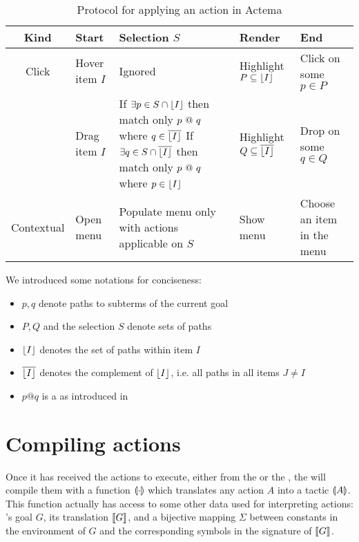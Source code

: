 \begin{table*}[]
  \def\arraystretch{1.5}
  \begin{tabular}{|c|C{0.2\textwidth}|C{0.4\textwidth}|C{0.25\textwidth}|C{0.2\textwidth}|}
  \hline
  \textbf{Kind} & \textbf{Start}       & \textbf{Selection $S$} &
  \textbf{Render}                      & \textbf{End} \\ \hline
  Click         & Hover item $I$       & Ignored & Highlight $P \subseteq
  \lfloor I \rfloor$ & Click on some $p \in P$    \\ \hline
             & Drag item $I$        &
      If $\exists p \in S \cap \lfloor I \rfloor$ then match only $p \operatorname{\,@\,} q$ where
      $q \in \overline{\lfloor I \rfloor}$
      \newline
      If $\exists q \in S \cap \overline{\lfloor I \rfloor}$ then match only $p
      \operatorname{\,@\,} q$ where $p \in \lfloor I \rfloor$
    & Highlight $Q \subseteq \overline{\lfloor I \rfloor}$ & Drop on some $q \in Q$ \\ \hline
  Contextual    & Open menu & Populate menu only with actions
  applicable on $S$ & Show menu & Choose an item in the menu \\ \hline
  \end{tabular}
  \raggedright
  \parbox{\textwidth}{
    \vspace{1.5em}
    We introduced some notations for conciseness:
    \begin{itemize}
      \item $p, q$ denote paths to subterms of the current goal
      \item $P, Q$ and the selection $S$ denote sets of paths
      \item $\lfloor I \rfloor$ denotes the set of paths within item $I$
      \item $\overline{\lfloor I \rfloor}$ denotes the complement of $\lfloor I \rfloor$, i.e.
      all paths in all items $J \not= I$
      \item $p @ q$ is a  as introduced in 
    \end{itemize}}

  \caption{Protocol for applying an action in Actema}
\end{table*}


\section{Compiling actions}

Once it has received the actions to execute, either from the 
or the , the  will compile them with a function
$\llparenthesis \cdot \rrparenthesis$ which translates any action $A$ into a  tactic
$\llparenthesis A \rrparenthesis$. This function actually has access to some other data used for
interpreting actions: 's goal $G$, its  translation $\llbracket G \rrbracket$, and a
bijective mapping $\Sigma$ between  constants in the environment of $G$ and
the corresponding  symbols in the  signature of $\llbracket G \rrbracket$.


